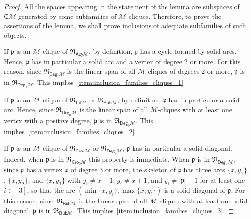 \documentclass[10pt,reqno]{amsart}
\numberwithin{equation}{subsection}
\newcommand{\Mca}{\mathcal{M}}
\newcommand{\Pfr}{\mathfrak{p}}
\newcommand{\Cli}{\mathsf{C}}
\newcommand{\Bub}{\mathsf{Bub}}
\newcommand{\Deg}{\mathsf{Deg}}
\newcommand{\Cro}{\mathsf{Cro}}
\newcommand{\Acy}{\mathsf{Acy}}
\newcommand{\Inf}{\mathrm{Inf}}
\newcommand{\Rel}{\mathfrak{R}}
\begin{document}
\begin{proof}
    All the spaces appearing in the statement of the lemma are subspaces
    of $\Cli\Mca$ generated by some subfamilies of $\Mca$-cliques.
    Therefore, to prove the assertions of the lemma, we shall prove
    inclusions of adequate subfamilies of such objects.
    \smallskip

    If $\Pfr$ is an $\Mca$-clique of $\Rel_{\Acy\Mca}$, by definition,
    $\Pfr$ has a cycle formed by solid arcs. Hence, $\Pfr$ has in
    particular a solid arc and a vertex of degree $2$ or more. For this
    reason, since $\Rel_{\Deg_1\Mca}$ is the linear span of all
    $\Mca$-cliques of degrees $2$ or more, $\Pfr$ is in
    $\Rel_{\Deg_1\Mca}$. This
    implies~\ref{item:inclusion_families_cliques_1}.
    \smallskip

    If $\Pfr$ is an $\Mca$-clique of $\Rel_{\Inf\Mca}$ or
    $\Rel_{\Bub\Mca}$, by definition, $\Pfr$ has in particular a solid
    arc. Hence, since $\Rel_{\Deg_0\Mca}$ is the linear span of all
    $\Mca$-cliques with at least one vertex with a positive degree,
    $\Pfr$ is in $\Rel_{\Deg_0\Mca}$. This
    implies~\ref{item:inclusion_families_cliques_2}.
    \smallskip

    If $\Pfr$ is an $\Mca$-clique of $\Rel_{\Cro_0\Mca}$ or
    $\Rel_{\Deg_2\Mca}$, $\Pfr$ has in particular a solid diagonal.
    Indeed, when $\Pfr$ is in $\Rel_{\Cro_0\Mca}$ this property is
    immediate. When $\Pfr$ is in $\Rel_{\Deg_2\Mca}$, since $\Pfr$ has a
    vertex $x$ of degree $3$ or more, the skeleton of $\Pfr$ has three
    arcs $\{x, y_1\}$, $\{x, y_2\}$, and $\{x, y_3\}$ with
    $y_i \ne x - 1$, $y_i \ne x + 1$, and $y_i \ne |\Pfr| + 1$ for at
    least one $i \in [3]$, so that the arc
    $(\min\{x, y_i\}, \max\{x, y_i\})$ is a solid diagonal of $\Pfr$. For
    this reason, since $\Rel_{\Bub\Mca}$ is the linear span of all
    $\Mca$-cliques with at least one solid diagonal, $\Pfr$ is in
    $\Rel_{\Bub\Mca}$. This
    implies~\ref{item:inclusion_families_cliques_3}.
    \smallskip


\end{proof}
\end{document}
